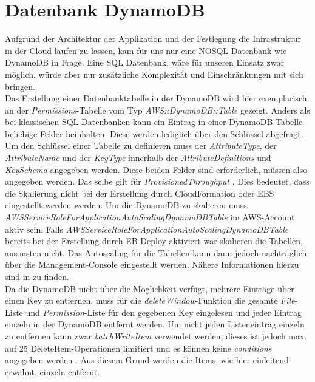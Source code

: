 \documentclass[a4paper, 12pt]{scrreprt}
\renewcommand\_{\textunderscore\allowbreak}
\begin{document}
\section{Datenbank DynamoDB}
Aufgrund der Architektur der Applikation und der Festlegung die Infrastruktur in der Cloud laufen zu lassen, kam für uns nur eine NOSQL Datenbank wie DynamoDB in Frage. Eine SQL Datenbank, wäre für unseren Einsatz zwar möglich, würde aber nur zusätzliche Komplexität und Einschränkungen mit sich bringen. \\
Das Erstellung einer Datenbanktabelle in der DynamoDB wird hier exemplarisch an der \textit{Permissions}-Tabelle vom Typ \textit{AWS::DynamoDB::Table} gezeigt. Anders als bei klassischen SQL-Datenbanken kann ein Eintrag in einer DynamoDB-Tabelle beliebige Felder beinhalten. Diese werden lediglich über den Schlüssel abgefragt. Um den Schlüssel einer Tabelle zu definieren muss der \textit{AttributeType}, der \textit{AttributeName} und der \textit{KeyType} innerhalb der \textit{AttributeDefinitions} und \textit{KeySchema} angegeben werden. Diese beiden Felder sind erforderlich, müssen also angegeben werden. Das selbe gilt für \textit{ProvisionedThroughput} \cite{AWSDa}.
Dies bedeutet, dass die Skalierung nicht bei der Erstellung durch CloudFormation oder EBS eingestellt werden werden. Um die DynamoDB zu skalieren muss \textit{AWSServiceRoleForApplicationAutoScaling\_DynamoDBTable} im AWS-Account aktiv sein. Falls \textit{AWSServiceRoleForApplicationAutoScaling\_DynamoDBTable} bereits bei der Erstellung durch EB-Deploy aktiviert war skalieren die Tabellen,  ansonsten nicht. Das Autoscaling für die Tabellen kann dann jedoch nachträglich über die Management-Console eingestellt werden. Nähere Informationen hierzu sind in \cite{AWSDb} zu finden.
\\[0.5cm]
Da die DynamoDB nicht über die Möglichkeit verfügt, mehrere Einträge über einen Key zu entfernen, muss für die \textit{deleteWindow}-Funktion die gesamte \textit{File}-Liste und \textit{Permission}-Liste für den gegebenen Key eingelesen und jeder Eintrag einzeln in der DynamoDB entfernt werden.
Um nicht jeden Listeneintrag einzeln zu entfernen kann zwar \textit{batchWriteItem} verwendet werden, dieses ist jedoch max. auf 25 DeleteItem-Operationen limitiert und es können keine \textit{conditions} angegeben werden \cite{AWSJSSDKD}. Aus diesem Grund werden die Items, wie hier einleitend erwähnt, einzeln entfernt.
\end{document}
